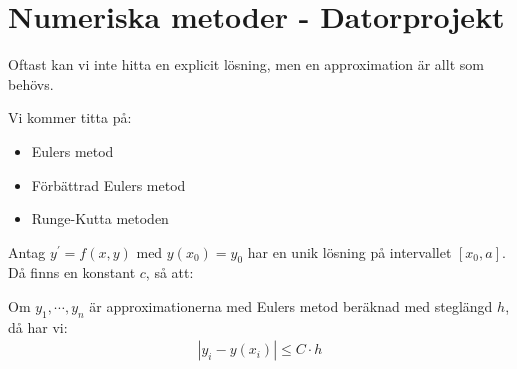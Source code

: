 \section{Numeriska metoder - Datorprojekt}
\par\bigskip
\noindent Oftast kan vi inte hitta en explicit lösning, men en approximation är allt som behövs.\par
\noindent Vi kommer titta på:
\begin{itemize}
  \item Eulers metod
  \item Förbättrad Eulers metod
  \item Runge-Kutta metoden
\end{itemize}
\par\bigskip
\begin{theo}
  Antag $y^{\prime} = f(x,y)$ med $y(x_0) = y_0$ har en unik lösning på intervallet $[x_0, a]$. Då finns en konstant $c$, så att:
  \par\bigskip
  \noindent Om $y_1, \cdots, y_n$ är approximationerna med Eulers metod beräknad med steglängd $h$, då har vi:
  \begin{equation*}
    \begin{gathered}
      \left|y_i-y(x_i)\right|\leq C\cdot h
    \end{gathered}
  \end{equation*}
\end{theo}

